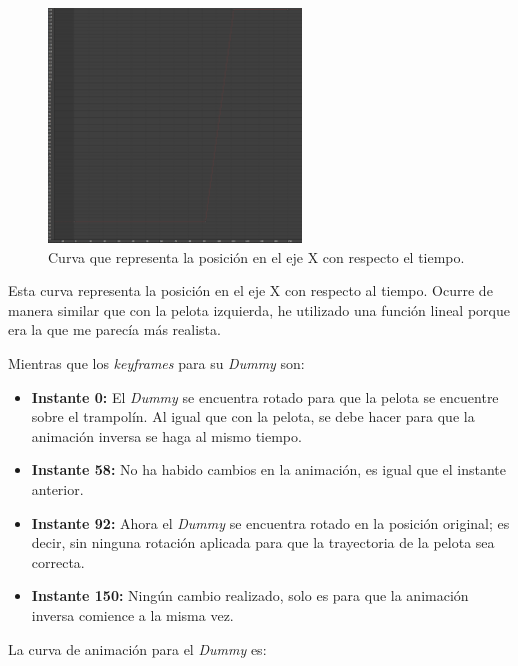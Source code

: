 \documentclass{article}
\begin{document}
 \begin{figure}[H]
    \centering
    \includegraphics[width=0.6\textwidth]{imagenes/curvas/PR/pelota/red.png}
    \caption{Curva que representa la posición en el eje X con respecto el tiempo.}
 \end{figure}

Esta curva representa la posición en el eje X con respecto al tiempo. Ocurre de manera similar que con la pelota izquierda, he utilizado una función lineal porque era la que me parecía más realista.


Mientras que los \textit{keyframes} para su \textit{Dummy} son:

\begin{itemize}
    \item \textbf{Instante 0: }El \textit{Dummy} se encuentra rotado para que la pelota se encuentre sobre el trampolín. Al igual que con la pelota, se debe hacer para que la animación inversa se haga al mismo tiempo.
    \item \textbf{Instante 58: }No ha habido cambios en la animación, es igual que el instante anterior.
    \item \textbf{Instante 92: }Ahora el \textit{Dummy} se encuentra rotado en la posición original; es decir, sin ninguna rotación aplicada para que la trayectoria de la pelota sea correcta.
    \item \textbf{Instante 150: }Ningún cambio realizado, solo es para que la animación inversa comience a la misma vez.
\end{itemize}

\bigskip

La curva de animación para el \textit{Dummy} es:
\end{document}
